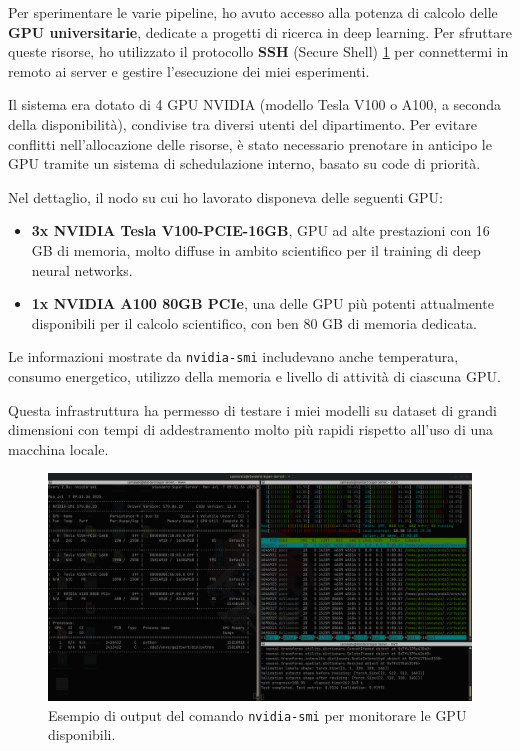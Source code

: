 Per sperimentare le varie pipeline, ho avuto accesso alla potenza di calcolo delle \textbf{GPU universitarie}, dedicate a progetti di ricerca in deep learning. Per sfruttare queste risorse, ho utilizzato il protocollo \textbf{SSH} (Secure Shell) \ref{fig:gpu_info} per connettermi in remoto ai server e gestire l’esecuzione dei miei esperimenti.

Il sistema era dotato di 4 GPU NVIDIA (modello Tesla V100 o A100, a seconda della disponibilità), condivise tra diversi utenti del dipartimento. Per evitare conflitti nell’allocazione delle risorse, è stato necessario prenotare in anticipo le GPU tramite un sistema di schedulazione interno, basato su code di priorità.

Nel dettaglio, il nodo su cui ho lavorato disponeva delle seguenti GPU:
\begin{itemize}
\item \textbf{3x NVIDIA Tesla V100-PCIE-16GB}, GPU ad alte prestazioni con 16 GB di memoria, molto diffuse in ambito scientifico per il training di deep neural networks.
\item \textbf{1x NVIDIA A100 80GB PCIe}, una delle GPU più potenti attualmente disponibili per il calcolo scientifico, con ben 80 GB di memoria dedicata. 
\end{itemize}

Le informazioni mostrate da \texttt{nvidia-smi} includevano anche temperatura, consumo energetico, utilizzo della memoria e livello di attività di ciascuna GPU. 

Questa infrastruttura ha permesso di testare i miei modelli su dataset di grandi dimensioni con tempi di addestramento molto più rapidi rispetto all’uso di una macchina locale.

\begin{figure}[H] 
  	\centering 
 	\includegraphics[width=\textwidth]{images/2025-07-07-09-52-55.png} 
	 \caption{Esempio di output del comando \texttt{nvidia-smi} per monitorare le GPU disponibili.}
	 \label{fig:gpu_info}
 \end{figure} 